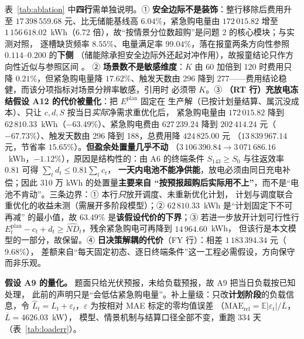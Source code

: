 表~\ref{tab:ablation} 中\textbf{四行}需单独说明。① \textbf{安全边际不是装饰}：整行移除后费用升至
\(17\,398\,559.68\) 元、比无储能基线高 \(6.04\%\)，紧急购电量由 \(172\,015.82\) 增至
\(1\,156\,618.02\)~kWh（6.72 倍），故“按情景分位数超购”是问题 2 的核心模块；与实测对照，
逐槽缺货频率 \(8.55\%\)、电量满足率 \(99.04\%\)，落在报童两条方向性参照 \(0.114\)--\(0.200\) 的\textbf{下侧}
（储能除承担安全边际外还起对冲作用），故报童结论只作方向性近似与参照区间 。
② \textbf{场景数不是敏感维度}：\(K\) 由 60 加倍到 120 时费用只降 \(0.21\%\)，但紧急购电量降
\(17.62\%\)、触发天数由 296 降到 277——费用结论稳健，而该分项指标对场景分辨率敏感，引用时
必须带 \(K\)。③ \textbf{（RT 行）充放电冻结假设 A12 的代价被量化}：把 \(E^{\text{plan}}\) 固定在
生产解（已按计划量结算、属沉没成本）、只让 \(c,d,S\) 按当日\emph{实际}净需求重优化后，
紧急购电量由 \(172\,015.82\) 降到 \(62\,810.33\)~kWh（\(-63.49\%\)）、紧急购电费由 \(627\,239.24\)
降到 \(202\,414.24\) 元（\(-67.73\%\)）、触发天数由 296 降到 188，总费用降 \(424\,825.00\) 元
（\(13\,839\,967.14\) 元，节省率 \(15.65\%\)）。\textbf{但盈余处置量几乎不动}
（\(3\,106\,390.84\to3\,071\,686.16\)~kWh，\(-1.12\%\)），原因是结构性的：由 A6 的终端条件
\(S_{143}\ge S_0\) 与往返效率 \(0.81\) 可得 \(\sum_td_t\le0.81\sum_tc_t\)，
\textbf{一天内电池不能净供能}，放电必须由同日充电补偿；因此 310 万 kWh 的处置量\textbf{主要来自
“按预报超购后实际用不上”}，而不是“电池不肯动”。三条边界：① 本行\emph{只}放开调度、未重新优化计划，
计划与调度联合重优化的收益未测（需展开多阶段模型）；② \(62\,810.33\)~kWh 是“计划固定下不可再减”
的最小值，故 \(63.49\%\) 是\textbf{该假设代价的下界}；③ 若进一步放开计划可行性行
\(E^{\text{plan}}_t-c_t+d_t\ge\widehat{ND}_t\)，残余紧急购电可再降到 \(14\,964.60\)~kWh，
但该行是本文模型的一部分，故保留。④ \textbf{日决策解耦的代价}（FY 行）：相差 \(1\,183\,394.34\) 元（\(9.68\%\)），
差额来自“每天固定初态、逐日终端条件”这一工程必需假设，方向保守而非乐观。

\textbf{假设 A9 的量化。} 题面只给光伏预报，未给负载预报，故 A9 把当日负载按已知处理，
此前的声明只是“会低估紧急购电量”。补上量级：只改\textbf{计划阶段}的负载信息，令
\(\widehat L_t=L_t+\varepsilon_t\)，\(\varepsilon\) 为按相对 MAE 标定的零均值误差
（\(\mathrm{MAE}_{\text{rel}}=\mathbb{E}|\varepsilon_t|/\overline L\)，\(\overline L=4626.03\)~kW），
模型、情景机制与结算口径全部不变，重跑 334 天（表~\ref{tab:loaderr}）。

